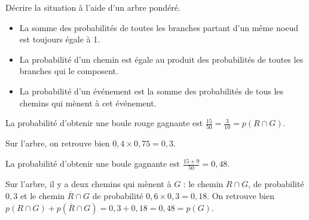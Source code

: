 \documentclass[a4paper,11pt]{article}
\begin{document}
\begin{cexemple}
\begin{center}
	\end{center}
\end{cexemple}

\begin{cexercice}
Décrire la situation à l'aide d'un arbre pondéré.
\end{cexercice}

\begin{cthm}[s]
\vspace{-0.2cm}
\begin{itemize}[leftmargin=*]
	\item La somme des probabilités de toutes les branches partant d'un même noeud est toujours égale à 1.
	\item La probabilité d'un chemin est égale au produit des probabilités de toutes les branches qui le composent.
	\item La probabilité d'un événement est la somme des probabilités de tous les chemins qui mènent à cet événement.
\end{itemize}
\end{cthm}

\begin{cexemple}
La probabilité d'obtenir une boule rouge gagnante est $\tfrac{15}{50}=\tfrac{3}{10}=p(R \cap G)$.

\tabula{}Sur l'arbre, on retrouve bien  $0,4 \times 0,75 = 0,3$.

La probabilité d'obtenir une boule gagnante est $\tfrac{15+9}{50}=0,48$.

Sur l'arbre,  il y a deux chemins qui mènent à $G$ : le chemin $R \cap G$, de probabilité $0,3$ et le chemin $\overline{R} \cap G$ de probabilité $0,6 \times 0,3=0,18$. On retrouve bien $p(R \cap G)+p(\overline{R} \cap G)=0,3+0,18= 0,48=p(G)$.
\end{cexemple}
\end{document}
